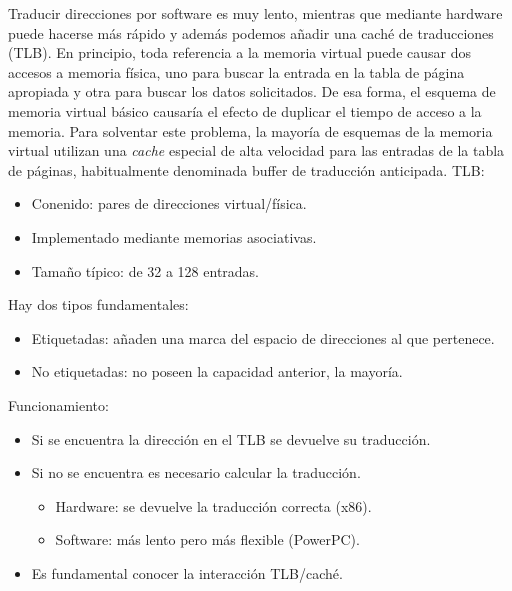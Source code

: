 \documentclass{article}
\begin{document}
Traducir direcciones por software es muy lento, mientras que mediante hardware puede hacerse más rápido y además podemos añadir una caché de traducciones (TLB). En principio, toda referencia a la memoria virtual puede causar dos accesos a memoria física, uno para buscar la entrada en la tabla de página apropiada y otra para buscar los datos solicitados. De esa forma, el esquema de memoria virtual básico causaría el efecto de duplicar el tiempo de acceso a la memoria. Para solventar este problema, la mayoría de esquemas de la memoria virtual utilizan una \textit{cache} especial de alta velocidad para las entradas de la tabla de páginas, habitualmente denominada buffer de traducción anticipada. TLB:
\begin{itemize}
\item Conenido: pares de direcciones virtual/física.

\item Implementado mediante memorias asociativas.

\item Tamaño típico: de 32 a 128 entradas.
\end{itemize}

Hay dos tipos fundamentales:
\begin{itemize}
\item Etiquetadas: añaden una marca del espacio de direcciones al que pertenece.

\item No etiquetadas: no poseen la capacidad anterior, la mayoría.
\end{itemize}

Funcionamiento:
\begin{itemize}
\item Si se encuentra la dirección en el TLB se devuelve su traducción.

\item Si no se encuentra es necesario calcular la traducción.
	\begin{itemize}
	\item Hardware: se devuelve la traducción correcta (x86).
	
	\item Software: más lento pero más flexible (PowerPC).
	\end{itemize}

\item Es fundamental conocer la interacción TLB/caché.
\end{itemize}
\end{document}
